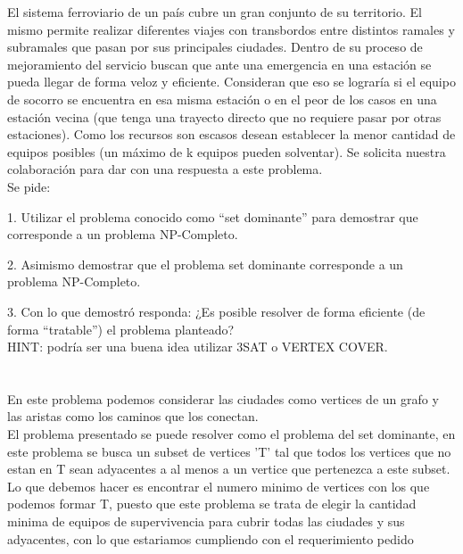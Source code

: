 El sistema ferroviario de un país cubre un gran conjunto de su territorio. El mismo permite realizar diferentes viajes con transbordos entre distintos ramales y subramales que pasan por sus principales ciudades. Dentro de su proceso de mejoramiento del servicio buscan que ante una emergencia en una estación se pueda llegar de forma veloz y eficiente. Consideran que eso se lograría si el equipo de socorro se encuentra en esa misma estación o en el peor de los casos en una estación vecina (que tenga una trayecto directo que no requiere pasar por otras estaciones). Como los recursos son escasos desean establecer la menor cantidad de equipos posibles (un máximo de k equipos pueden solventar). Se solicita nuestra colaboración para dar con una respuesta a este problema. \\

Se pide:

1. Utilizar el problema conocido como “set dominante” para demostrar que corresponde a un problema NP-Completo.

2. Asimismo demostrar que el problema set dominante corresponde a un problema NP-Completo.

3. Con lo que demostró responda: ¿Es posible resolver de forma eficiente (de forma “tratable”) el problema planteado? \\

HINT: podría ser una buena idea utilizar 3SAT o VERTEX COVER. \\

\section{}

En este problema podemos considerar las ciudades como vertices de un grafo y las aristas como los caminos que los conectan. \\
El problema presentado se puede resolver como el problema del set dominante, en este problema se busca un subset de vertices 'T' tal que todos los vertices que no estan en T sean adyacentes a al menos a un vertice que pertenezca a este subset.\\
Lo que debemos hacer es encontrar el numero minimo de vertices con los que podemos formar T, puesto que este problema se trata de elegir la cantidad minima de equipos de supervivencia para cubrir todas las ciudades y sus adyacentes, con lo que estariamos cumpliendo con el requerimiento pedido\\ 



